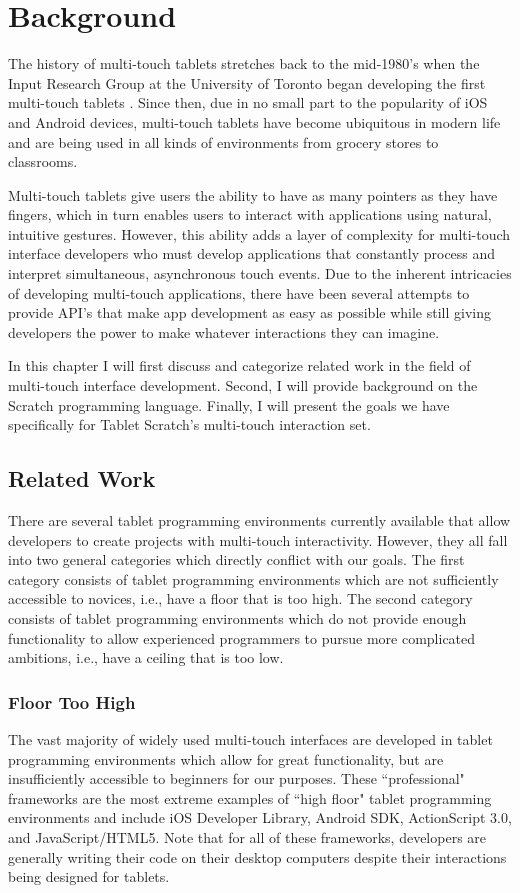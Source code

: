 \chapter{Background}
The history of multi-touch tablets stretches back to the mid-1980's when the Input Research Group at the University of Toronto began developing the first multi-touch tablets \cite{LBS, Mehta}. Since then, due in no small part to the popularity of iOS and Android devices, multi-touch tablets have become ubiquitous in modern life and are being used in all kinds of environments from grocery stores to classrooms.

Multi-touch tablets give users the ability to have as many pointers as they have fingers, which in turn enables users to interact with applications using natural, intuitive gestures. However, this ability adds a layer of complexity for multi-touch interface developers who must develop applications that constantly process and interpret simultaneous, asynchronous touch events. Due to the inherent intricacies of developing multi-touch applications, there have been several attempts to provide API's that make app development as easy as possible while still giving developers the power to make whatever interactions they can imagine.

In this chapter I will first discuss and categorize related work in the field of multi-touch interface development. Second, I will provide background on the Scratch programming language. Finally, I will present the goals we have specifically for Tablet Scratch's multi-touch interaction set.
 
\section{Related Work}
There are several tablet programming environments currently available that allow developers to create projects with multi-touch interactivity. However, they all fall into two general categories which directly conflict with our goals. The first category consists of tablet programming environments which are not sufficiently accessible to novices, i.e., have a floor that is too high. The second category consists of tablet programming environments which do not provide enough functionality to allow experienced programmers to pursue more complicated ambitions, i.e., have a ceiling that is too low. 

\subsection{Floor Too High}
The vast majority of widely used multi-touch interfaces are developed in tablet programming environments which allow for great functionality, but are insufficiently accessible to beginners for our purposes. These ``professional" frameworks are the most extreme examples of ``high floor" tablet programming environments and include iOS Developer Library\cite{iOS}, Android SDK\cite{Android}, ActionScript 3.0\cite{ActionScript}, and JavaScript/HTML5\cite{JavaScript}. Note that for all of these frameworks, developers are generally writing their code on their desktop computers despite their interactions being designed for tablets.

